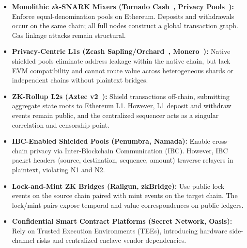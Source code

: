 \documentclass[journal,10pt,twocolumn]{IEEEtran}
\theoremstyle{definition}
\theoremstyle{remark}
\begin{document}
\begin{itemize}[leftmargin=*]
    \item \textbf{Monolithic zk-SNARK Mixers (Tornado Cash~\cite{pertsev2019tornado}, Privacy Pools~\cite{buterin2023blockchain}):} Enforce equal-denomination pools on Ethereum. Deposits and withdrawals occur on the same chain; all full nodes construct a global transaction graph. Gas linkage attacks remain structural.
    \item \textbf{Privacy-Centric L1s (Zcash Sapling/Orchard~\cite{hopwood2016zcash}, Monero~\cite{noether2016ringct}):} Native shielded pools eliminate address leakage within the native chain, but lack EVM compatibility and cannot route value across heterogeneous shards or independent chains without plaintext bridges.
    \item \textbf{ZK-Rollup L2s (Aztec v2~\cite{aztec2022}):} Shield transactions off-chain, submitting aggregate state roots to Ethereum L1. However, L1 deposit and withdraw events remain public, and the centralized sequencer acts as a singular correlation and censorship point.
    \item \textbf{IBC-Enabled Shielded Pools (Penumbra, Namada):} Enable cross-chain privacy via Inter-Blockchain Communication (IBC). However, IBC packet headers (source, destination, sequence, amount) traverse relayers in plaintext, violating N1 and N2.
    \item \textbf{Lock-and-Mint ZK Bridges (Railgun, zkBridge):} Use public lock events on the source chain paired with mint events on the target chain. The lock/mint pairs expose temporal and value correspondences on public ledgers.
    \item \textbf{Confidential Smart Contract Platforms (Secret Network, Oasis):} Rely on Trusted Execution Environments (TEEs), introducing hardware side-channel risks and centralized enclave vendor dependencies.
\end{itemize}
\end{document}
